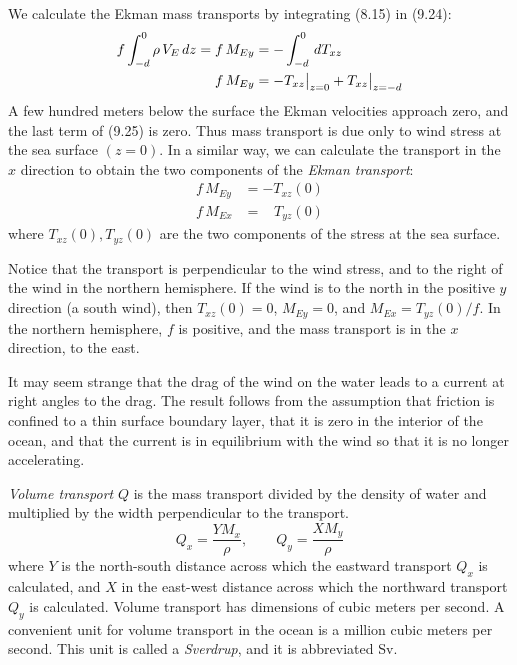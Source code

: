 We calculate the Ekman mass transports by
integrating (8.15) in (9.24):
\begin{align}
f\int_{-d}^0\rho\,V_E\,dz =f\,M_{Ey} &=-\int_{-d}^0 \,d T_{xz}   \notag \\
f\,M_{Ey} &=-T_{xz}\big|_{z=0} + T_{xz}\big|_{z=-d}
\end{align}
A few hundred meters below the surface the Ekman velocities approach
zero, and the last term of (9.25) is zero. Thus mass
transport is due only to wind
stress at the sea
surface $(z = 0)$. In a similar way, we can calculate the transport in
the $x$ direction to obtain the two components of the \textit{Ekman
  transport}:
\begin{subequations}
\begin{align}
f\,M_{Ey} &= -T_{xz}(0) \\
f\,M_{Ex} &= \;\;\; T_{yz}(0)
\end{align}
\end{subequations}
where $T_{xz}(0), T_{yz}(0)$ are the two components of the stress at
the sea surface.

Notice that the transport is perpendicular to the wind
stress, and to the
right of the wind in the northern hemisphere. If the wind is to the
north in the positive $y$ direction (a south wind), then $T_{xz}(0) =
0$, $M_{Ey} = 0$, and $M_{Ex} = T_{yz}(0)/f$. In the northern
hemisphere, $f$ is positive, and the mass transport is in the $x$
direction, to the east.

It may seem strange that the drag of the wind on the water leads to a
current at right angles to the drag. The result follows from the
assumption that friction is confined to a thin surface boundary layer,
that it is zero in the interior of the ocean, and that the current is
in equilibrium with the wind so that it is no longer accelerating.

\textit{Volume transport} $Q$ is the mass
transport divided by the density of water and multiplied by the width
perpendicular to the transport.
\begin{equation}
Q_x=\frac{Y M_x}{\rho}, \qquad Q_y=\frac{X M_y}{\rho}
\end{equation}
where $Y$ is the north-south distance across which the eastward
transport $Q_x$ is calculated, and $X$ in
the east-west distance across which the northward transport $Q_y$ is
calculated. Volume transport has dimensions of cubic meters per
second. A convenient unit for volume transport in the ocean is a
million cubic meters per second. This unit is called a
\textit{Sverdrup}, and it is abbreviated Sv.

